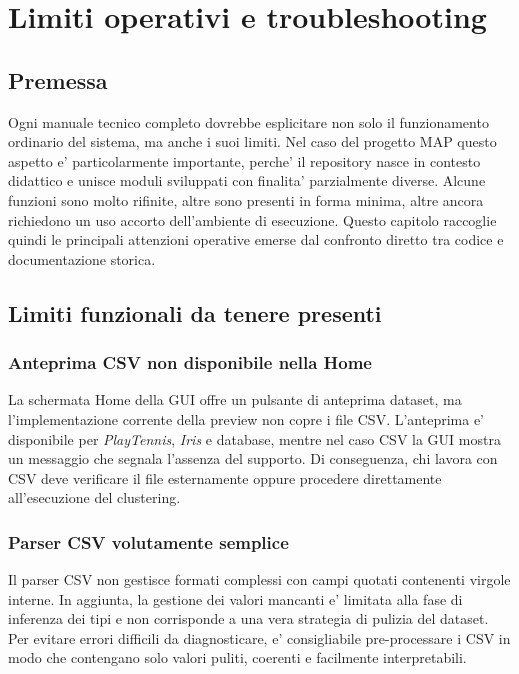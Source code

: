 \chapter{Limiti operativi e troubleshooting}
\label{chap:troubleshooting}

\section{Premessa}

Ogni manuale tecnico completo dovrebbe esplicitare non solo il funzionamento ordinario
del sistema, ma anche i suoi limiti. Nel caso del progetto MAP questo aspetto e'
particolarmente importante, perche' il repository nasce in contesto didattico e unisce
moduli sviluppati con finalita' parzialmente diverse. Alcune funzioni sono molto
rifinite, altre sono presenti in forma minima, altre ancora richiedono un uso accorto
dell'ambiente di esecuzione. Questo capitolo raccoglie quindi le principali attenzioni
operative emerse dal confronto diretto tra codice e documentazione storica.

\section{Limiti funzionali da tenere presenti}

\subsection{Anteprima CSV non disponibile nella Home}

La schermata Home della GUI offre un pulsante di anteprima dataset, ma l'implementazione
corrente della preview non copre i file CSV. L'anteprima e' disponibile per
\emph{PlayTennis}, \emph{Iris} e database, mentre nel caso CSV la GUI mostra un messaggio
che segnala l'assenza del supporto. Di conseguenza, chi lavora con CSV deve verificare il
file esternamente oppure procedere direttamente all'esecuzione del clustering.

\subsection{Parser CSV volutamente semplice}

Il parser CSV non gestisce formati complessi con campi quotati contenenti virgole
interne. In aggiunta, la gestione dei valori mancanti e' limitata alla fase di inferenza
dei tipi e non corrisponde a una vera strategia di pulizia del dataset. Per evitare
errori difficili da diagnosticare, e' consigliabile pre-processare i CSV in modo che
contengano solo valori puliti, coerenti e facilmente interpretabili.

